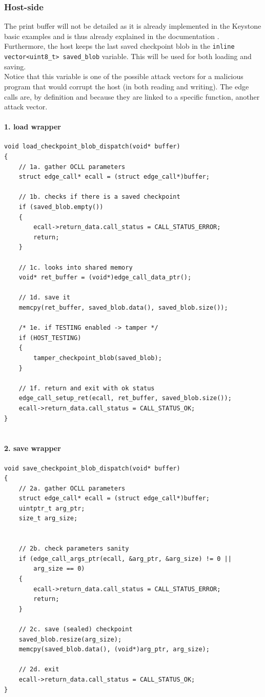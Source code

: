 \documentclass[11pt,a4paper]{report}
\begin{document}
\subsubsection{Host-side}
\label{subsub:checkpoint-host}
The print buffer will not be detailed as it is already implemented in the Keystone basic examples and is thus already explained in the documentation \cite{keystone-web}.
Furthermore, the host keeps the last saved checkpoint blob in the \verb|inline vector<uint8_t> saved_blob| variable.
This will be used for both loading and saving.
\\

Notice that this variable is one of the possible attack vectors for a malicious program that would corrupt the host (in both reading and writing).
The edge calls are, by definition and because they are linked to a specific function, another attack vector.

\paragraph{1. load wrapper}
\begin{verbatim}
void load_checkpoint_blob_dispatch(void* buffer)
{   
    // 1a. gather OCLL parameters
    struct edge_call* ecall = (struct edge_call*)buffer;

    // 1b. checks if there is a saved checkpoint
    if (saved_blob.empty()) 
    {
        ecall->return_data.call_status = CALL_STATUS_ERROR;
        return;
    }

    // 1c. looks into shared memory
    void* ret_buffer = (void*)edge_call_data_ptr();

    // 1d. save it
    memcpy(ret_buffer, saved_blob.data(), saved_blob.size());

    /* 1e. if TESTING enabled -> tamper */
    if (HOST_TESTING)
    {    
        tamper_checkpoint_blob(saved_blob);
    }

    // 1f. return and exit with ok status
    edge_call_setup_ret(ecall, ret_buffer, saved_blob.size());
    ecall->return_data.call_status = CALL_STATUS_OK;
}


\end{verbatim}

\paragraph{2. save wrapper}
\begin{verbatim}
void save_checkpoint_blob_dispatch(void* buffer)
{
    // 2a. gather OCLL parameters
    struct edge_call* ecall = (struct edge_call*)buffer;
    uintptr_t arg_ptr;
    size_t arg_size;


    // 2b. check parameters sanity
    if (edge_call_args_ptr(ecall, &arg_ptr, &arg_size) != 0 ||
        arg_size == 0) 
    {
        ecall->return_data.call_status = CALL_STATUS_ERROR;
        return;
    }

    // 2c. save (sealed) checkpoint
    saved_blob.resize(arg_size);
    memcpy(saved_blob.data(), (void*)arg_ptr, arg_size);

    // 2d. exit
    ecall->return_data.call_status = CALL_STATUS_OK;
}
\end{verbatim}
\end{document}
